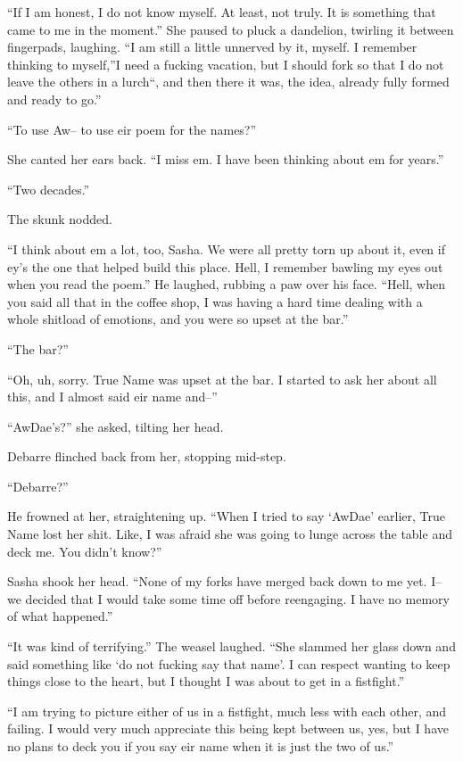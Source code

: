 ``If I am honest, I do not know myself. At least, not truly. It is something that came to me in the moment.'' She paused to pluck a dandelion, twirling it between fingerpads, laughing. ``I am still a little unnerved by it, myself. I remember thinking to myself,''I need a fucking vacation, but I should fork so that I do not leave the others in a lurch``, and then there it was, the idea, already fully formed and ready to go.''

``To use Aw-- to use eir poem for the names?''

She canted her ears back. ``I miss em. I have been thinking about em for years.''

``Two decades.''

The skunk nodded.

``I think about em a lot, too, Sasha. We were all pretty torn up about it, even if ey's the one that helped build this place. Hell, I remember bawling my eyes out when you read the poem.'' He laughed, rubbing a paw over his face. ``Hell, when you said all that in the coffee shop, I was having a hard time dealing with a whole shitload of emotions, and you were so upset at the bar.''

``The bar?''

``Oh, uh, sorry. True Name was upset at the bar. I started to ask her about all this, and I almost said eir name and--''

``AwDae's?'' she asked, tilting her head.

Debarre flinched back from her, stopping mid-step.

``Debarre?''

He frowned at her, straightening up. ``When I tried to say `AwDae' earlier, True Name lost her shit. Like, I was afraid she was going to lunge across the table and deck me. You didn't know?''

Sasha shook her head. ``None of my forks have merged back down to me yet. I-- we decided that I would take some time off before reengaging. I have no memory of what happened.''

``It was kind of terrifying.'' The weasel laughed. ``She slammed her glass down and said something like `do not fucking say that name'. I can respect wanting to keep things close to the heart, but I thought I was about to get in a fistfight.''

``I am trying to picture either of us in a fistfight, much less with each other, and failing. I would very much appreciate this being kept between us, yes, but I have no plans to deck you if you say eir name when it is just the two of us.''

